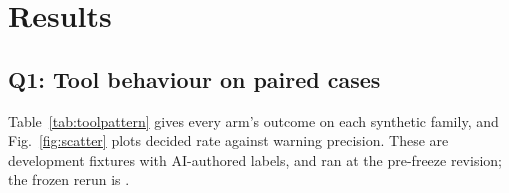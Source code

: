 \section{Results}\label{sec:results}

\subsection{Q1: Tool behaviour on paired cases}\label{sec:res-benchmark}

Table~\ref{tab:toolpattern} gives every arm's outcome on each synthetic
family, and Fig.~\ref{fig:scatter} plots decided rate against warning
precision. These are development fixtures with AI-authored labels, and
\tool{} ran at the pre-freeze revision; the frozen rerun is
.

